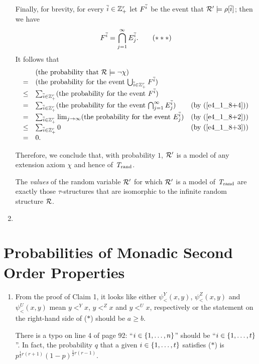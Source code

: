 \begin{enumerate}[1.]
Finally, for brevity, for every $\overline{i} \in \mathbb{Z}_+^{r}$ let $F^{\overline{i}}$ be the event that $\mathcal{R}' \models \rho[\overline{i}]$; then we have
\begin{equation}\label{e4_1_8+4}
F^{\overline{i}} = \bigcap^\infty_{j = 1} E^{\overline{i}}_j. \tag{$\ast\ast\ast$}
\end{equation}
It follows that
\[
\begin{array}{lll}
\    & (\text{the probability that \mathmode{\strct{R} \satis \neg\chi}}) & \cr
=    & (\text{the probability for the event \mathmode{\bunion_{\vect{i} \in \cartpwr{\posint}{r}} F^{\vect{i}}}}) & \cr
\leq & \sum_{\vect{i} \in \cartpwr{\posint}{r}} (\text{the probability for the event \mathmode{F^{\vect{i}}}}) & \cr
=    & \sum_{\vect{i} \in \cartpwr{\posint}{r}} (\text{the probability for the event \mathmode{\bintsc^\infty_{j = 1} E^{\vect{i}}_j}}) & \text{(by (\ref{e4_1_8+4}))} \cr
=    & \sum_{\vect{i} \in \cartpwr{\posint}{r}} \lim_{j \to \infty} (\text{the probability for the event \mathmode{E^{\vect{i}}_j}}) & \text{(by (\ref{e4_1_8+2}))} \cr
\leq & \sum_{\vect{i} \in \cartpwr{\posint}{r}} 0 & \text{(by (\ref{e4_1_8+3}))} \cr
=    & 0.
\end{array}
\]

Therefore, we conclude that, with probability $1$, $\mathcal{R}'$ is a model of any extension axiom $\chi$ and hence of $\mathit{T}_{\mathrm{rand}}$.

\begin{note}
The \emph{values} of the random variable $\mathcal{R}'$ for which $\mathcal{R}'$ is a model of $\mathit{T}_{\mathrm{rand}}$ are exactly those $\tau$-structures that are isomorphic to the infinite random structure $\mathcal{R}$.
\end{note}
%
\item {}
%
\end{enumerate}


\setcounter{section}{4}
\section{Probabilities of Monadic Second Order Properties}
\begin{enumerate}[1.]
%
\item {} From the proof of Claim 1, it looks like either $\psi^Y_<(x, y)$, $\psi^Z_<(x, y)$ and $\psi^U_<(x, y)$ mean $y <^Y x$, $y <^Z x$ and $y <^U x$, respectively or the statement on the right-hand side of ($\ast$) should be $a \geq b$.

There is a typo on line 4 of page 92: ``$i \in {\{1, \ldots, n\}}$'' should be ``$i \in {\{1, \ldots, t\}}$''. In fact, the probability $q$ that a given $i \in {\{1, \ldots, t\}}$ satisfies ($\ast$) is $p^{\frac{1}{2}r(r + 1)}(1 - p)^{\frac{1}{2}r(r - 1)}$.
%
\end{enumerate}


